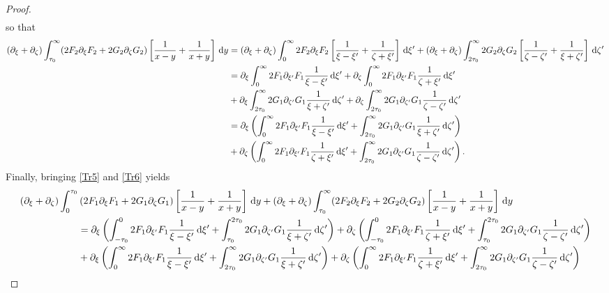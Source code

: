 \documentclass[10pt,reqno,oneside,a4paper, landscape]{article}
\begin{document}
\begin{proof}
\begin{align*}
\end{align*}
so that
\begin{align}
(\partial_\xi + \partial_\zeta)\int_{\tau_0}^\infty (2 F_2 \partial_\xi F_2 + 2 G_2 \partial_\zeta G_2 )\left[ \frac{1}{x-y} + \frac{1}{x+y} \right] \,\mathrm{d} y &= (\partial_\xi + \partial_\zeta) \int_{0}^\infty 2 F_2 \partial_\xi F_2 \left[ \frac{1}{\xi - \xi'} + \frac{1}{\zeta + \xi'} \right] \,\mathrm{d} \xi'  + (\partial_\xi + \partial_\zeta) \int_{2\tau_0}^{\infty} 2 G_2 \partial_\zeta G_2 \left[ \frac{1}{\zeta - \zeta'} + \frac{1}{\xi + \zeta'}\right] \,\mathrm{d} \zeta' \nonumber\\
&= \partial_\xi \int_{0}^\infty 2 F_1\partial_{\xi'}F_1 \frac{1}{\xi -\xi'} \,\mathrm{d} \xi'  + \partial_\zeta \int_{0}^\infty 2 F_1\partial_{\xi'}F_1 \frac{1}{\zeta +\xi'} \,\mathrm{d} \xi' \nonumber \\
&+ \partial_\xi \int_{2\tau_0}^{\infty}  2 G_1 \partial_{\zeta'} G_1 \frac{1}{\xi + \zeta'} \,\mathrm{d} \zeta' + \partial_\zeta \int_{2\tau_0}^{\infty}  2 G_1 \partial_{\zeta'} G_1 \frac{1}{\zeta - \zeta'} \,\mathrm{d} \zeta' \nonumber\\
&= \partial_\xi \left( \int_{0}^\infty 2 F_1\partial_{\xi'}F_1  \frac{1}{\xi -\xi'} \,\mathrm{d} \xi' + \int_{2\tau_0}^{\infty}  2 G_1 \partial_{\zeta'} G_1 \frac{1}{\xi + \zeta'} \,\mathrm{d} \zeta' \right) \nonumber \\
&+\partial_\zeta \left( \int_{0}^\infty 2 F_1\partial_{\xi'}F_1 \frac{1}{\zeta +\xi'} \,\mathrm{d} \xi' + \int_{2\tau_0}^{\infty}  2 G_1 \partial_{\zeta'} G_1 \frac{1}{\zeta - \zeta'} \,\mathrm{d} \zeta' \right). \label{Tr6}
\end{align}
Finally, bringing \eqref{Tr5} and \eqref{Tr6} yields
\begin{align*}
(\partial_\xi + \partial_\zeta) \int_0^{\tau_0} &\left( 2 F_1  \partial_\xi F_1 + 2 G_1 \partial_\zeta G_1 \right) \left[ \frac{1}{x-y} + \frac{1}{x+y} \right] \D y + (\partial_\xi + \partial_\zeta)\int_{\tau_0}^\infty (2 F_2 \partial_\xi F_2 + 2 G_2 \partial_\zeta G_2 )\left[ \frac{1}{x-y} + \frac{1}{x+y} \right] \D y \\
&= \partial_\xi \left( \int^{0}_{-\tau_0} 2 F_1\partial_{\xi'}F_1  \frac{1}{\xi -\xi'} \D \xi' + \int_{\tau_0}^{2\tau_0} 2 G_1 \partial_{\zeta'} G_1 \frac{1}{\xi + \zeta'} \D \zeta' \right) + \partial_\zeta \left( \int^{0}_{-\tau_0} 2 F_1\partial_{\xi'}F_1 \frac{1}{\zeta +\xi'} \D \xi' + \int_{\tau_0}^{2\tau_0} 2 G_1 \partial_{\zeta'} G_1 \frac{1}{\zeta - \zeta'} \D \zeta' \right) \\
&+\partial_\xi \left( \int_{0}^\infty 2 F_1\partial_{\xi'}F_1  \frac{1}{\xi -\xi'} \D \xi' + \int_{2\tau_0}^{\infty}  2 G_1 \partial_{\zeta'} G_1 \frac{1}{\xi + \zeta'} \D \zeta' \right) + \partial_\zeta \left( \int_{0}^\infty 2 F_1\partial_{\xi'}F_1 \frac{1}{\zeta +\xi'} \D \xi' + \int_{2\tau_0}^{\infty}  2 G_1 \partial_{\zeta'} G_1 \frac{1}{\zeta - \zeta'} \D \zeta' \right) \\

\end{align*}
\end{proof}
\end{document}

